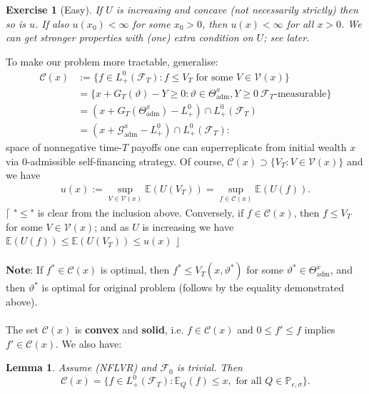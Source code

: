 \documentclass[12pt,a4paper, twoside]{article}
\newtheorem{lem}{Lemma}[section]
\newtheorem{exe}{Exercise}[section]
\theoremstyle{definition}
\newcommand{\EE}{\mathbb{E}} %
\newcommand{\PP}{\mathbb{P}} %
\begin{document}
\begin{exe}[Easy] \label{ex20} If $U$ is increasing and concave (not necessarily strictly) then so is $u$. If also $u(x_0) < \infty$ for some $x_0>0$, then $u(x) < \infty$ for all $x>0$. We can get stronger properties with (one) extra condition on $U$; see later. 
\end{exe}
To make our problem more tractable, generalise: 
\begin{align*}
\mathcal{C}(x)&:= \{ f \in L_+^0( \mathcal{F}_T): f \leq V_T \text{ for some } V \in \mathcal{V}(x) \} \\
&= \{ x + G_T( \vartheta)- Y \geq 0 : \vartheta \in \Theta_\text{adm}^x, Y \geq 0 \ \mathcal{F}_T\text{-measurable}\} \\
&= (x + G_T( \Theta_\text{adm}^x) - L_+^0) \cap L_+^0( \mathcal{F}_T)  \\
&= (x + \mathcal{G}_\text{adm}^x-L_+^0) \cap L_+^0 ( \mathcal{F}_T):
\end{align*}
space of nonnegative time-$T$ payoffs one can superreplicate from initial wealth $x$ via $0$-admissible self-financing strategy. \newpage
 Of course, $\mathcal{C}(x) \supset \{ V_T : V \in \mathcal{V}(x)\}$ and we have 
 \begin{align*}
 u(x):= \sup_{V \in \mathcal{V}(x)} \EE(U(V_T)) = \sup_{f \in \mathcal{C}(x)} \EE(U(f)). \tag{$\spadesuit$}
 \end{align*}
$\lceil$ "$\leq$" is clear from the inclusion above. Conversely, if $f \in \mathcal{C}(x)$, then $f \leq V_T$ for some $V \in \mathcal{V}(x)$; and as $U$ is increasing we have $\EE(U(f)) \leq \EE(U(V_T)) \leq u(x)$ \hfill $\rfloor$
\\\\
\textbf{Note}: If $f^* \in \mathcal{C}(x)$ is optimal, then $f^* \leq V_T( x, \vartheta^*)$ for some $\vartheta^* \in \Theta_\text{adm}^x$, and then $\vartheta^*$ is optimal for original problem (follows by the equality demonstrated above). 
\\\\
The set $\mathcal{C}(x)$ is \textbf{convex} and \textbf{solid}, i.e. $f \in \mathcal{C}(x)$ and $0 \leq f' \leq f$ implies $f' \in \mathcal{C}(x)$. We also have:
\begin{lem} \label{L101} Assume (NFLVR) and $\mathcal{F}_0$ is trivial. Then $$\mathcal{C}(x) = \{ f \in L_+^0( \mathcal{F}_T) : \EE_Q(f) \leq x, \text{ for all } Q \in \PP_{e, \sigma}\}.$$
\end{lem}
\end{document}
